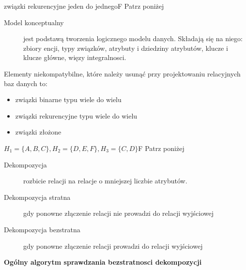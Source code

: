 
{związki rekurencyjne jeden do jednego}{F}
{Patrz poniżej}{\\}
\noindent
\begin{description}
   \item[Model konceptualny] jest podstawą tworzenia logicznego modelu danych. Składają się na niego: zbiory encji, typy związków, atrybuty i dziedziny atrybutów, klucze i klucze główne, więzy integralnosci.
\end{description}
Elementy niekompatybilne, które należy usunąć przy projektowaniu relacyjnych baz danych to:
\begin{itemize}
  \item związki binarne typu wiele do wielu
  \item związki rekurencyjne typu wiele do wielu
  \item związki złożone
\end{itemize}


{$H_1 = \{A, B, C\}, H_2 = \{D, E, F\}, H_3 = \{C, D\}$}{F}
{Patrz poniżej}{\\}
\noindent
\begin{description}
   	\item[Dekompozycja] rozbicie relacji na relacje o mniejszej liczbie atrybutów.
	\item[Dekompozycja stratna] gdy ponowne złączenie relacji nie prowadzi do relacji wyjściowej
	\item[Dekompozycja bezstratna] gdy ponowne złączenie relacji prowadzi do relacji wyjściowej
\end{description}
\vspace{0.2cm}
\noindent \textbf{Ogólny algorytm sprawdzania bezstratnosci dekompozycji}
\vspace{0.2cm}

